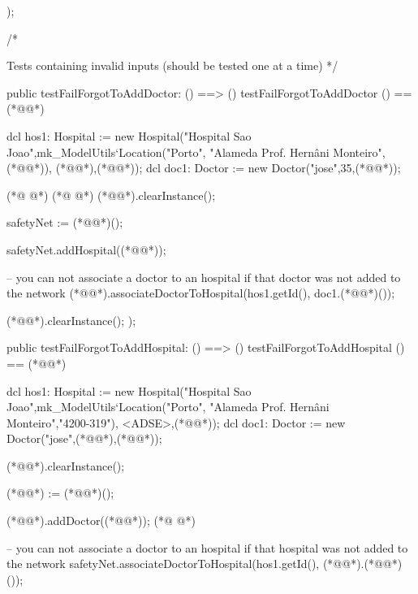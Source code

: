 \begin{vdmpp}[breaklines=true]
);

/*

 Tests containing invalid inputs (should be tested one at a time)
*/

public testFailForgotToAddDoctor: () ==> ()
 testFailForgotToAddDoctor () == (*@\vdmnotcovered{(}@*)
 
   dcl hos1: Hospital := new Hospital("Hospital Sao Joao",mk_ModelUtils`Location("Porto", "Alameda Prof. Hernâni Monteiro",(*@@*)), {(*@@*),(*@@*)});
   dcl doc1: Doctor := new Doctor("jose",35,(*@@*));
   
(*@
\label{testFailDisassociatingADoctorFromAnHospital:1053}
@*)
(*@
\label{testFailDisassoatingADoctorFromAnHospital:1053}
@*)
   (*@@*).clearInstance();
   
   safetyNet := (*@@*)();
   
   safetyNet.addHospital((*@@*));
    
   -- you can not associate a doctor to an hospital if that doctor was not added to the network 
   (*@@*).associateDoctorToHospital(hos1.getId(), doc1.(*@@*)());
   
   (*@@*).clearInstance();
);
 
 
 public testFailForgotToAddHospital: () ==> ()
  testFailForgotToAddHospital () == (*@\vdmnotcovered{(}@*)
  
    dcl hos1: Hospital := new Hospital("Hospital Sao Joao",mk_ModelUtils`Location("Porto", "Alameda Prof. Hernâni Monteiro","4200-319"), {<ADSE>,(*@@*)});
   dcl doc1: Doctor := new Doctor("jose",(*@@*),(*@@*));
   
   (*@@*).clearInstance();   
   
   (*@@*) := (*@@*)();
   
   (*@@*).addDoctor((*@@*));
(*@
\label{testFailCreatingAnAppointment:1077}
@*)
    
   -- you can not associate a doctor to an hospital if that hospital was not added to the network 
   safetyNet.associateDoctorToHospital(hos1.getId(), (*@@*).(*@@*)());
   

\end{vdmpp}
